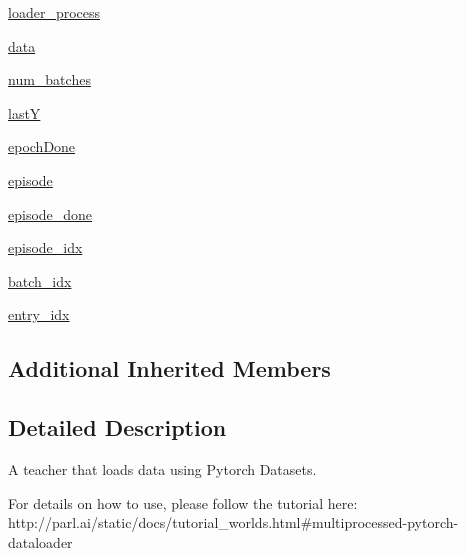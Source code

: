 \begin{DoxyCompactItemize}
\hyperlink{classparlai_1_1core_1_1pytorch__data__teacher_1_1PytorchDataTeacher_a7d0c50251b2e88746aa6a6ff4a454ca8}{loader\+\_\+process}
\item 
\hyperlink{classparlai_1_1core_1_1pytorch__data__teacher_1_1PytorchDataTeacher_afc57c27e502b27aff86630e7d9768700}{data}
\item 
\hyperlink{classparlai_1_1core_1_1pytorch__data__teacher_1_1PytorchDataTeacher_abaa8cbd02f036fb06d9e5290d331bb40}{num\+\_\+batches}
\item 
\hyperlink{classparlai_1_1core_1_1pytorch__data__teacher_1_1PytorchDataTeacher_a452bb226c67e6c4002679fa293433e27}{lastY}
\item 
\hyperlink{classparlai_1_1core_1_1pytorch__data__teacher_1_1PytorchDataTeacher_ad39ab22ed0829965a4e418ccda1f5b51}{epoch\+Done}
\item 
\hyperlink{classparlai_1_1core_1_1pytorch__data__teacher_1_1PytorchDataTeacher_a65bef2570fe8e94a2077fc30240e4524}{episode}
\item 
\hyperlink{classparlai_1_1core_1_1pytorch__data__teacher_1_1PytorchDataTeacher_a7b3026e037904f2e92282729dc53bd13}{episode\+\_\+done}
\item 
\hyperlink{classparlai_1_1core_1_1pytorch__data__teacher_1_1PytorchDataTeacher_a096cd29f1b94d0fb626505907280494e}{episode\+\_\+idx}
\item 
\hyperlink{classparlai_1_1core_1_1pytorch__data__teacher_1_1PytorchDataTeacher_af2d84c6c04e53cc119de23ad07efbbe3}{batch\+\_\+idx}
\item 
\hyperlink{classparlai_1_1core_1_1pytorch__data__teacher_1_1PytorchDataTeacher_ab0e45ca1923e9b99747c117dfbaa95f3}{entry\+\_\+idx}
\end{DoxyCompactItemize}
\subsection*{Additional Inherited Members}


\subsection{Detailed Description}
\begin{DoxyVerb}A teacher that loads data using Pytorch Datasets.

For details on how to use, please follow the tutorial here:
http://parl.ai/static/docs/tutorial_worlds.html#multiprocessed-pytorch-dataloader
\end{DoxyVerb}
 

